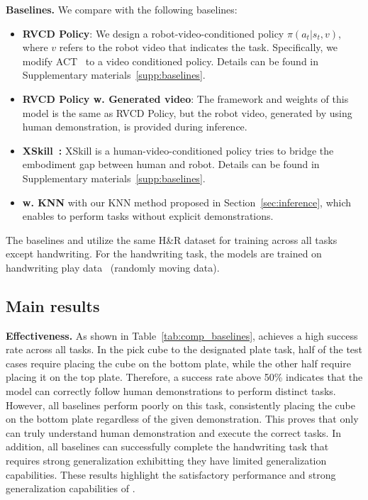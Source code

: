 \noindent\textbf{Baselines.} We compare with the following baselines:
\begin{itemize}
    \item \textbf{RVCD Policy}: We design a robot-video-conditioned policy $\pi(a_t|s_t,v)$, where $v$ refers to the robot video that indicates the task. Specifically, we modify ACT~\cite{zhao2023learning} to a video conditioned policy. Details can be found in Supplementary materials~\ref{supp:baselines}. 
    \item \textbf{RVCD Policy w. Generated video}: The framework and weights of this model is the same as RVCD Policy, but the robot video, generated by \system using human demonstration, is provided during inference.
    \item \textbf{XSkill~\cite{xu2023xskill}:} XSkill is a human-video-conditioned policy tries to bridge the embodiment gap between human and robot. Details can be found in Supplementary materials~\ref{supp:baselines}.
    \item \textbf{\system w. KNN} \system with our KNN method proposed in Section~\ref{sec:inference}, which enables to perform tasks without explicit demonstrations.
\end{itemize}
The baselines and \system utilize the same H\&R dataset for training across all tasks except handwriting. For the handwriting task, the models are trained on handwriting play data~\cite{wang2023mimicplay} (randomly moving data).


\subsection{Main results}


\noindent\textbf{Effectiveness.} As shown in Table~\ref{tab:comp_baselines}, \system achieves a high success rate across all tasks. In the pick cube to the designated plate task, half of the test cases require placing the cube on the bottom plate, while the other half require placing it on the top plate. Therefore, a success rate above 50\% indicates that the model can correctly follow human demonstrations to perform distinct tasks. However, all baselines perform poorly on this task, consistently placing the cube on the bottom plate regardless of the given demonstration. This proves that only \system can truly understand human demonstration and execute the correct tasks. In addition, all baselines can successfully complete the handwriting task that requires strong generalization exhibitting they have limited generalization capabilities. These results highlight the satisfactory performance and strong generalization capabilities of \system. 

